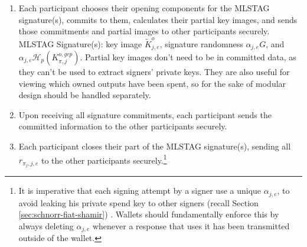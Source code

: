 \begin{enumerate}
\begin{enumerate}
        The initiator sends all this information to the other participants securely.\footnote{He doesn't need to send the output amounts $b_t$ directly, as they can be computed from $\mathit{amount}_t$. Monero takes the reasonable approach of creating a partial transaction filled with the information selected by the initiator, and sending that to other cosigners along with a list of related information like transaction private keys, destination addresses, the real inputs, etc.} The other participants can signal agreement by sending their part of the next communication round, or negotiate for changes.
        \item Each participant chooses their opening components for the MLSTAG signature(s), commits to them, calculates their partial key images, and sends those commitments and partial images to other participants securely.\\

        MLSTAG Signature(s): key image $\tilde{K}^{o}_{j,e}$, signature randomness $\alpha_{j,e} G$, and $\alpha_{j,e} \mathcal{H}_p(K^{o,grp}_{\pi,j})$. Partial key images don't need to be in committed data, as they can't be used to extract signers' private keys. They are also useful for viewing which owned outputs have been spent, so for the sake of modular design should be handled separately.%
        \item Upon receiving all signature commitments, each participant sends the committed information to the other participants securely.
        \item Each participant closes their part of the MLSTAG signature(s), sending all $r_{{\pi_j},j,e}$ to the other participants securely.\footnote{It is imperative that each signing attempt by a signer use a unique $\alpha_{j,e}$, to avoid leaking his private spend key to other signers (recall Section \ref{sec:schnorr-fiat-shamir}) \cite{MRL-0009-multisig}. Wallets should fundamentally enforce this by always deleting $\alpha_{j,e}$ whenever a response that uses it has been transmitted outside of the wallet.}
    \end{enumerate}
\end{enumerate}

